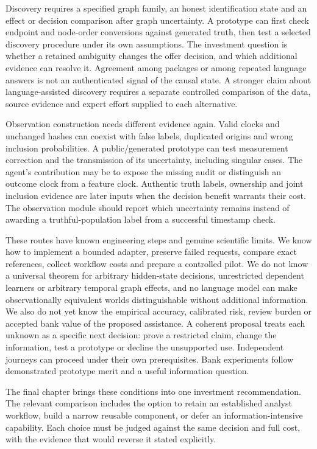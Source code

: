 Discovery requires a specified graph family, an honest identification state and
an effect or decision comparison after graph uncertainty. A prototype can first
check endpoint and node-order conversions against generated truth, then test a
selected discovery procedure under its own assumptions. The investment question
is whether a retained ambiguity changes the offer decision, and which additional
evidence can resolve it. Agreement among packages or among repeated language
answers is not an authenticated signal of the causal state. A stronger claim
about language-assisted discovery requires a separate controlled comparison of
the data, source evidence and expert effort supplied to each alternative.

Observation construction needs different evidence again. Valid clocks and
unchanged hashes can coexist with false labels, duplicated origins and wrong
inclusion probabilities. A public/generated prototype can test measurement
correction and the transmission of its uncertainty, including singular cases.
The agent's contribution may be to expose the missing audit or distinguish an
outcome clock from a feature clock. Authentic truth labels, ownership and joint
inclusion evidence are later inputs when the decision benefit warrants their
cost. The observation module should report which uncertainty remains instead
of awarding a truthful-population label from a successful timestamp check.
\citep{exec14_l8_design}

These routes have known engineering steps and genuine scientific limits. We
know how to implement a bounded adapter, preserve failed requests, compare exact
references, collect workflow costs and prepare a controlled pilot. We do not
know a universal theorem for arbitrary hidden-state decisions, unrestricted
dependent learners or arbitrary temporal graph effects, and no language model
can make observationally equivalent worlds distinguishable without additional
information. We also do not yet know the empirical accuracy, calibrated risk,
review burden or accepted bank value of the proposed assistance. A coherent
proposal treats each unknown as a specific next decision: prove a restricted
claim, change the information, test a prototype or decline the unsupported
use. Independent journeys can proceed under their own prerequisites. Bank
experiments follow demonstrated prototype merit and a useful information
question. \citep{exec14_l8_design}

The final chapter brings these conditions into one investment recommendation. The relevant comparison includes the option to retain an established analyst workflow, build a narrow reusable component, or defer an information-intensive capability. Each choice must be judged against the same decision and full cost, with the evidence that would reverse it stated explicitly.

\label{exec14:l8-development-end}

